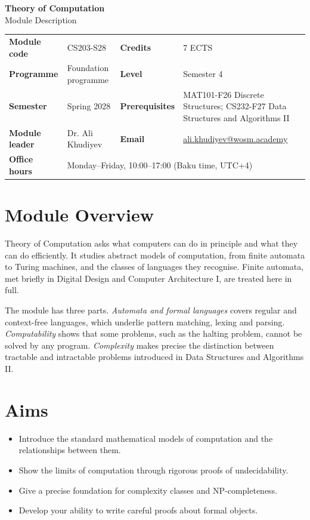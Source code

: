 \documentclass[11pt,a4paper]{article}
\makeatletter
\newcommand{\ModuleTitle}{Theory of Computation}
\newcommand{\ModuleCode}{CS203-S28}
\newcommand{\Programme}{Foundation programme}
\newcommand{\Level}{Semester 4}
\newcommand{\Semester}{Spring 2028}
\newcommand{\Credits}{7 ECTS}
\newcommand{\ModuleLeader}{Dr. Ali Khudiyev}
\newcommand{\Email}{ali.khudiyev@wosm.academy}
\newcommand{\OfficeHours}{Monday--Friday, 10:00--17:00 (Baku time, UTC+4)}
\newcommand{\Prerequisites}{MAT101-F26 Discrete Structures; CS232-F27 Data Structures and Algorithms II}
\makeatother
\begin{document}
\begin{center}
  {\LARGE\bfseries\color{accent} \ModuleTitle}\\[4pt]
  {\large Module Description}
\end{center}
\vspace{6pt}

\begin{tabularx}{\textwidth}{>{\bfseries}l X >{\bfseries}l X}
\toprule
Module code   & \ModuleCode    & Credits      & \Credits \\
Programme     & \Programme     & Level        & \Level \\
Semester      & \Semester      & Prerequisites & \Prerequisites \\
Module leader & \ModuleLeader  & Email        & \href{mailto:\Email}{\Email} \\
Office hours  & \multicolumn{3}{l}{\OfficeHours} \\
\bottomrule
\end{tabularx}

\section{Module Overview}
Theory of Computation asks what computers can do in principle and what they can do
efficiently. It studies abstract models of computation, from finite automata to
Turing machines, and the classes of languages they recognise. Finite automata, met
briefly in Digital Design and Computer Architecture I, are treated here in full.

The module has three parts. \emph{Automata and formal languages} covers regular and
context-free languages, which underlie pattern matching, lexing and parsing.
\emph{Computability} shows that some problems, such as the halting problem, cannot
be solved by any program. \emph{Complexity} makes precise the distinction between
tractable and intractable problems introduced in Data Structures and Algorithms II.

\section{Aims}
\begin{itemize}
  \item Introduce the standard mathematical models of computation and the relationships between them.
  \item Show the limits of computation through rigorous proofs of undecidability.
  \item Give a precise foundation for complexity classes and NP-completeness.
  \item Develop your ability to write careful proofs about formal objects.
\end{itemize}
\end{document}
